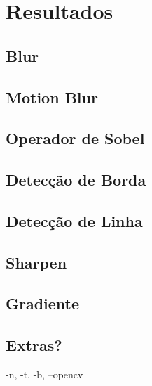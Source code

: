\section{Resultados}

\subsection{Blur} \label{sec:blur}
    

\subsection{Motion Blur} \label{sec:motion}
    

\subsection{Operador de Sobel} \label{sec:sobel}
    

\subsection{Detecção de Borda} \label{sec:borda}
    

\subsection{Detecção de Linha} \label{sec:linha}
    

\subsection{Sharpen} \label{sec:sharpen}
    

\subsection{Gradiente} \label{sec:grad}
    

\subsection{Extras?}

    -n, -t, -b, --opencv
